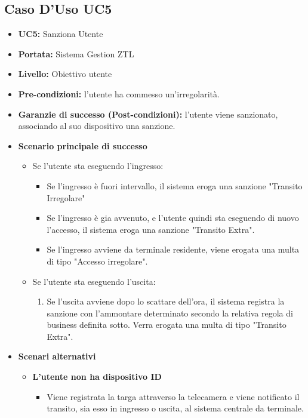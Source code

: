 \documentclass[12pt, letterpaper]{article}
\begin{document}
\subsection{Caso D'Uso UC5}
\begin{itemize}
    \item \textbf{UC5:} Sanziona Utente
    \item \textbf{Portata:} Sistema Gestion ZTL
    \item \textbf{Livello:} Obiettivo utente
    \item \textbf{Pre-condizioni:} l'utente ha commesso 
    un'irregolarità.
    \item \textbf{Garanzie di successo (Post-condizioni):} 
    l'utente viene sanzionato, associando al suo dispositivo
    una sanzione.
     
    \item \textbf{Scenario principale di successo}
    \begin{itemize}
        \item Se l'utente sta eseguendo l'ingresso:
        \begin{itemize}
            \item Se l'ingresso è fuori intervallo,
            il sistema eroga una sanzione "Transito 
            Irregolare"
            \item Se l'ingresso è gia avvenuto,
            e l'utente quindi sta eseguendo di 
            nuovo l'accesso, il sistema eroga una 
            sanzione "Transito Extra".
            \item Se l'ingresso avviene da terminale 
            residente, viene erogata una multa di tipo 
            "Accesso irregolare".
        \end{itemize} 
        \item Se l'utente sta eseguendo l'uscita:
        \begin{enumerate}
            \item Se l'uscita avviene dopo lo 
            scattare dell'ora, il sistema registra 
            la sanzione con l'ammontare determinato 
            secondo la relativa regola di business 
            definita sotto. Verra erogata una multa 
            di tipo "Transito Extra".
        \end{enumerate} 
    \end{itemize}
    
    \item \textbf{Scenari alternativi}
    \begin{itemize}
        \item \textbf{L'utente non ha dispositivo ID}
        \begin{itemize}
            \item Viene registrata la targa attraverso
            la telecamera e viene notificato il 
            transito, sia esso in ingresso o uscita,
            al sistema centrale da terminale.
        \end{itemize}
    \end{itemize}
    

\end{itemize}
\end{document}
